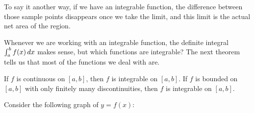\documentclass{ximera}
\begin{document}
To say it another way, if we have an integrable function, the difference between those sample points disappears once
we take the limit, and this limit is the actual net area of the region.

Whenever we are working with an integrable function, the definite integral $\int_a^b f(x) \mathop{}\!d x$ makes sense, but which functions are integrable?  The next theorem tells us that most of
the functions we deal with are.
\begin{theorem}
If $f$ is continuous on $[a,b]$, then $f$ is integrable on $[a,b]$.  If $f$ is bounded on $[a,b]$ with only finitely many discontinuities, then $f$ is integrable on $[a,b]$.
\end{theorem}


\begin{question}
Consider the following graph of $y=f(x)$:
\begin{image}
\end{image}
\end{question}
\end{document}
